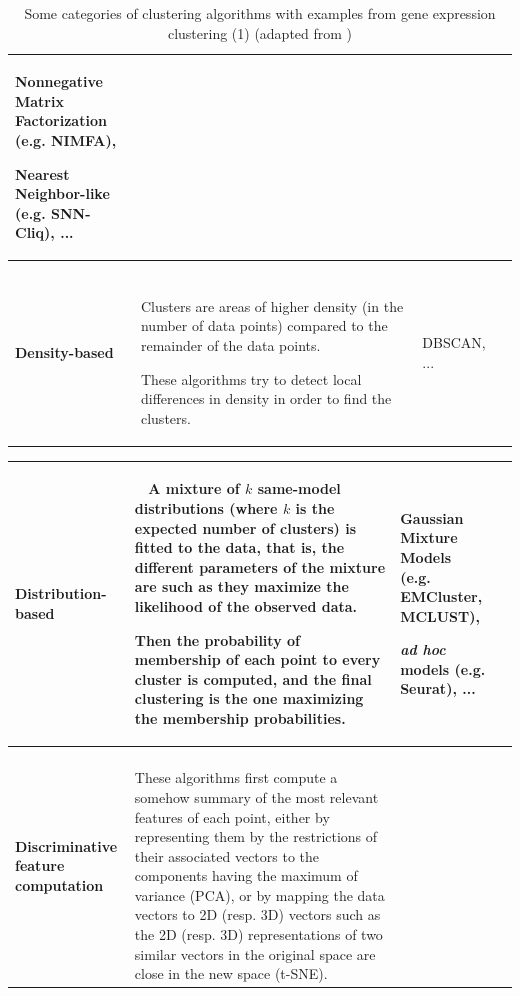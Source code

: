\documentclass{report}
\begin{document}
{\begin{table}[H]
\begin{tabular}{| l | l | l | l |}
{Nonnegative Matrix\\ Factorization\cite{lee1999learning}\\(e.g. NIMFA\cite{shao2016robust}),\\

Nearest Neighbor-like\\(e.g. SNN-Cliq\cite{xu2015identification}), ...}\\
\hline
\parbox[c]{5cm}{\textbf{Density-based}} & 
\parbox[c]{5cm}{~\\ Clusters are areas of higher density (in the number of data points) compared to the remainder of the data points.\\

These algorithms try to detect local differences in density in order to find the clusters.\newline} &
\parbox[c]{5cm}{DBSCAN\cite{ester1996density}, ...}\\
\hline
\end{tabular}
\caption{Some categories of clustering algorithms with examples from gene expression clustering (1) (adapted from \cite{classifclustering})}
\label{methods}
\end{table}

\begin{table}[H]
\centering
\begin{tabular}{| l | l | l | l |}
\hline
\parbox[c]{5cm}{\textbf{Distribution-based}} & 
\parbox[c]{5cm}{~\\ A mixture of $k$ same-model distributions (where $k$ is the expected number of clusters) is fitted to the data, that is, the different parameters of the mixture are such as they maximize the likelihood of the observed data.\\

Then the probability of membership of each point to every cluster is computed, and the final clustering is the one maximizing the membership probabilities.\newline} &
\parbox[c]{5cm}{Gaussian Mixture Models\\ (e.g. EMCluster\cite{melnykov2009model},\\MCLUST\cite{fraley1999mclust}),\\

\textit{ad hoc} models (e.g. Seurat\cite{satija2015spatial}), ...}\\
\hline
\parbox[c]{5cm}{\textbf{Discriminative feature\\computation}} & 
\parbox[c]{5cm}{~\\These algorithms first compute a somehow summary of the most relevant features of each point, either
by representing them by the restrictions of their associated vectors to the components having the maximum of variance (PCA), or
by mapping the data vectors to 2D (resp. 3D) vectors such as the 2D (resp. 3D) representations of two similar vectors in the 
original space are close in the new space (t-SNE).\\

}
\end{tabular}
\end{table}}
\end{document}
